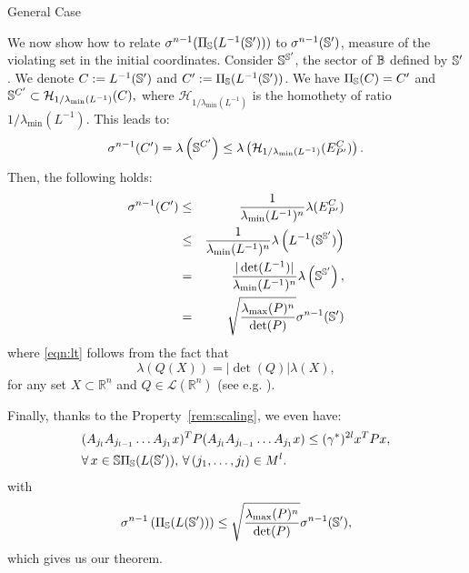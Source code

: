 \begin{subsection}{General Case}
\begin{pf}
We now show how to relate $\sigma^{n-1}(\Pi_{\mathbb{S}}(L^{-1}(\mathbb{S}')))$ to $\sigma^{n-1}(\mathbb{S}')$, measure of the violating set in the initial coordinates. Consider $\mathbb{S}^{\mathbb{S}'}$, the sector of $\mathbb{B}$ defined by $\mathbb{S}'$. We denote $C:= L^{-1}(\mathbb{S}')$ and $C':=\Pi_{\mathbb{S}}(L^{-1}(\mathbb{S}'))$. We have $\Pi_{\mathbb{S}}(C) = C'$ and $\mathbb{S}^{C'} \subset \mathcal{H}_{1/ \lambda_{\min}(L^{-1})}(C),$
where $\mathcal{H}_{1/ \lambda_{\min}(L^{-1})}$ is the homothety of ratio $1/ \lambda_{\min}(L^{-1})$. This leads to:
$$\sigma^{n-1}(C') = \lambda \left( \mathbb{S}^{C'} \right) \leq \lambda \left( \mathcal{H}_{1/ \lambda_{\min}(L^{-1})}(E_{P'}^{C}) \right).$$ Then, the following holds: \begin{eqnarray}
\nonumber\sigma^{n-1}(C') &\leq& \frac{1}{\lambda_{\min}(L^{-1})^n}\lambda(E_{P'}^{C}) \\
\nonumber &\leq&\frac{1}{\lambda_{\min}(L^{-1})^n} \lambda \left( L^{-1}(\mathbb{S}^{\mathbb{S}'}) \right)\\ 
\label{eqn:lt} &=&\frac{|\det(L^{-1})|}{\lambda_{\min}(L^{-1})^n}\lambda \left( \mathbb{S}^{\mathbb{S}'} \right),\\
\label{eqn:map1} &=&\sqrt{\frac{\lambda_{\max}(P)^n}{\det(P)}}\sigma^{n-1}(\mathbb{S}')
\end{eqnarray}
where \eqref{eqn:lt} follows from the fact that
$$ \lambda(Q(X)) = |\det(Q)| \lambda(X),$$
for any set $X \subset \mathbb{R}^n$ and $Q \in \mathcal{L}(\mathbb{R}^n)$ (see e.g. \cite{rudin}).

Finally, thanks to the Property~\ref{rem:scaling}, we even have:
\begin{equation}\label{eqn:P1}
\begin{aligned}
& (A_{j_l} A_{j_{l-1}} \dots A_{j_1} x)^T P (A_{j_l} A_{j_{l-1}} \dots A_{j_1} x) \leq (\gamma^*)^{2l} x^T P x, \\ 
& \forall\, x \in \mathbb{S} \Pi_{\mathbb{S}}(L(\mathbb{S}')), \,\forall\, (j_1,\dots,j_l) \in M^l.
\end{aligned}
\end{equation}
with $$\sigma^{n-1} \left(  \Pi_{\mathbb{S}}(L(\mathbb{S}')) \right) \leq \sqrt{\frac{\lambda_{\max}(P)^n}{\det(P)}}\sigma^{n-1}(\mathbb{S}'), $$ which gives us our theorem.
\end{pf}

\end{subsection}